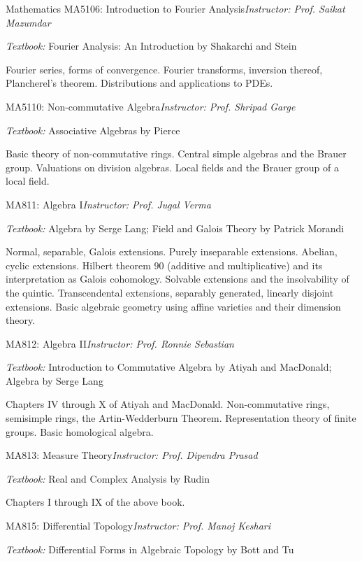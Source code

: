 \begin{rubric}{Mathematics}
    \entry*[AA] MA5106: Introduction to Fourier Analysis\hfill\emph{Instructor: Prof. Saikat Mazumdar}

    \emph{Textbook:} Fourier Analysis: An Introduction by Shakarchi and Stein

    Fourier series, forms of convergence. Fourier transforms, inversion thereof, Plancherel's theorem. Distributions and applications to PDEs.

    \entry*[AA] MA5110: Non-commutative Algebra\hfill\emph{Instructor: Prof. Shripad Garge}

    \emph{Textbook:} Associative Algebras by Pierce 

    Basic theory of non-commutative rings. Central simple algebras and the Brauer group. Valuations on division algebras. Local fields and the Brauer group of a local field.

    \entry*[AA] MA811: Algebra I\hfill\emph{Instructor: Prof. Jugal Verma}

    \emph{Textbook:} Algebra by Serge Lang; Field and Galois Theory by Patrick Morandi

    Normal, separable, Galois extensions. Purely inseparable extensions. Abelian, cyclic extensions. Hilbert theorem $90$ (additive and multiplicative) and its interpretation as Galois cohomology. Solvable extensions and the insolvability of the quintic. Transcendental extensions, separably generated, linearly disjoint extensions. Basic algebraic geometry using affine varieties and their dimension theory.

    \entry*[AA] MA812: Algebra II\hfill\emph{Instructor: Prof. Ronnie Sebastian}

    \emph{Textbook:} Introduction to Commutative Algebra by Atiyah and MacDonald; Algebra by Serge Lang

    Chapters IV through X of Atiyah and MacDonald. Non-commutative rings, semisimple rings, the Artin-Wedderburn Theorem. Representation theory of finite groups. Basic homological algebra.

    \entry*[AA] MA813: Measure Theory\hfill\emph{Instructor: Prof. Dipendra Prasad}

    \emph{Textbook:} Real and Complex Analysis by Rudin 

    Chapters I through IX of the above book.

    \entry*[AA] MA815: Differential Topology\hfill\emph{Instructor: Prof. Manoj Keshari}

    \emph{Textbook:} Differential Forms in Algebraic Topology by Bott and Tu


\end{rubric}
